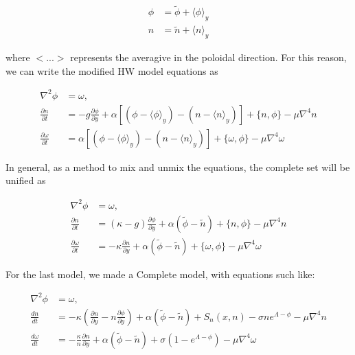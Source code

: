 \documentclass{hitec} %
\begin{document}
\begin{subequations}
\begin{align}
\phi & = \tilde{\phi} + \langle \phi\rangle_y \\
n & = \tilde{n} + \langle n\rangle_y
\end{align}
\end{subequations}

where $<...>$ represents the averagive in the poloidal direction. For this reason, we can write the modified HW model equations as

\begin{subequations}
\begin{align}
 \nabla^2 \phi & =  \omega, \quad \\
 \frac{\partial n}{\partial t}    & = - g \frac{\partial \phi}{\partial y} + \alpha [(\phi - \langle\phi\rangle_y) - (n - \langle n\rangle_y)]
 + \{n, \phi\} - \mu \nabla^4 n \\
  \frac{\partial \omega}{\partial t} & = \alpha [(\phi - \langle\phi\rangle_y) - (n - \langle n\rangle_y)]  + \{ \omega, \phi\}
  - \mu\nabla^4\omega
\end{align}
\end{subequations}


In general, as a method to mix and unmix the equations, the complete set will be unified as

\begin{subequations}
\begin{align}
 \nabla^2 \phi & =  \omega, \quad \\
 \frac{\partial n}{\partial t}     & = (\kappa - g) \frac{\partial \phi}{\partial y} + \alpha (\tilde{\phi} - \tilde{n})
 + \{n, \phi\} - \mu \nabla^4 n \\
  \frac{\partial \omega}{\partial t} & =  - \kappa\frac{\partial n}{\partial y} + \alpha ( \tilde{\phi} - \tilde{n}) + \{ \omega, \phi\}
- \mu\nabla^4\omega
\end{align}
\end{subequations}


For the last model, we made a Complete model, with equations such like:

\begin{subequations}
\begin{align}
 \nabla^2 \phi & =  \omega, \quad  \\
 \frac{d n}{d t} & = -\kappa \left(\frac{\partial n}{\partial y} - n \frac{\partial \phi}{\partial y}\right) + \alpha (\tilde{\phi} - \tilde{n}) + S_n(x, n) - \sigma n e^{\Lambda - \phi} - \mu \nabla^4 n  \\
  \frac{d \omega}{d  t} & =  - \frac{\kappa}{n}\frac{\partial n}{\partial y} + \alpha ( \tilde{\phi} - \tilde{n}) +\sigma\left(1-e^{\Lambda-\phi}\right) - \mu\nabla^4\omega
\end{align}
\end{subequations}
\end{document}
